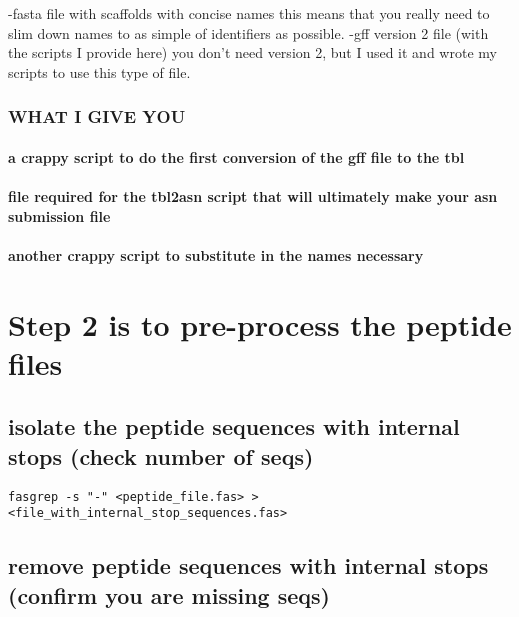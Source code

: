 \documentclass[11pt]{article}
\begin{document}
 -fasta file with scaffolds with concise names
    this means that you really need to slim down names to as simple of
    identifiers as possible. 
 -gff version 2 file (with the scripts I provide here)
    you don't need version 2, but I used it and wrote my scripts to
    use this type of file. 

\subsubsection*{WHAT I GIVE YOU}
\label{sec-1.3.2}

\paragraph*{a crappy script to do the first conversion of the gff file to the tbl}
\label{sec-1.3.2.1}

\paragraph*{file required for the tbl2asn script that will ultimately make your  asn submission file}
\label{sec-1.3.2.2}

\paragraph*{another crappy script to substitute in the names necessary}
\label{sec-1.3.2.3}

    
\section*{Step 2 is to pre-process the peptide files}
\label{sec-2}

\subsection*{isolate the peptide sequences with internal stops (check number of seqs)}
\label{sec-2.1}


\begin{verbatim}
fasgrep -s "-" <peptide_file.fas> > <file_with_internal_stop_sequences.fas>
\end{verbatim}


\subsection*{remove peptide sequences with internal stops (confirm you are missing seqs)}
\label{sec-2.2}
\end{document}
